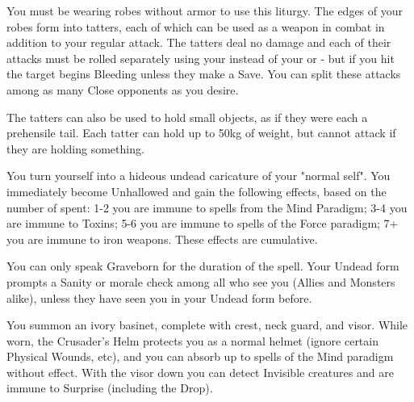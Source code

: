 {\MYSTERY [
  Name = Tattered Robe,
  Link = arcana-mystery-tattered-robe,
  Paradigm = Entropy,
  Save = Y (neg.),
  Duration = Combat or \SUM Minutes,
  Target = Self
]

You must be wearing robes without armor to use this liturgy.  The edges of your robes form into \DICE tatters, each of which can be used as a weapon in combat in addition to your regular attack. The tatters deal no damage and each of their attacks must be rolled separately using your \FOC instead of your \VIG or \DEX - but if you hit the target begins Bleeding unless they make a Save.  You can split these attacks among as many Close opponents as you desire.

The tatters can also be used to hold small objects, as if they were each a prehensile tail.  Each tatter can hold up to 50kg of weight, but cannot attack if they are holding something.

\MYSTERY [
  Name = Undead Visage,
  Link = arcana-mystery-undead-visage,
  Paradigm = Death,
  Save = n/a,
  Duration = Combat or \SUM Minutes,
  Target = Self
]

You turn yourself into a hideous undead caricature of your "normal self".  You immediately become Unhallowed and gain the following effects, based on the number of \DICE spent:  1-2 you are immune to spells from the Mind Paradigm; 3-4 you are immune to Toxins; 5-6 you are immune to spells of the Force paradigm; 7+  you are immune to iron weapons.  These effects are cumulative.

You can only speak Graveborn for the duration of the spell.  Your Undead form prompts a Sanity or morale check among all who see you (Allies and Monsters alike), unless they have seen you in your Undead form before. 


\newpage

\MYSTERY [
  Name = Crusader's Helm,
  Link = arcana-mystery-crusaders-helm,
  Paradigm = Force,
  Save = n/a,
  Duration = Session,
  Target = Self
]

You summon an ivory basinet, complete with crest, neck guard, and visor.  While worn, the Crusader's Helm protects you as a normal helmet (ignore certain Physical Wounds, etc), and you can absorb up to \DICE spells of the Mind paradigm without effect.  With the visor down you can detect Invisible creatures and are immune to Surprise (including the Drop).

\MYSTERY [
  Name = Grounding Mantra,
  Link = arcana-mystery-grounding-mantra,
  Paradigm = Elements,
  Save = Y (neg.),
  Duration = Markovian,
  Target = Close\, Nearby\, or Far-Away Target(s)
]

}
